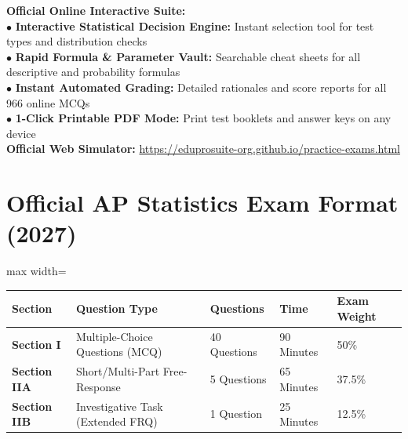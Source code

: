 \begin{center}
\begin{tcolorbox}[standard jigsaw,width=0.95\linewidth,colback=NavyBlue!5!white,colframe=NavyBlue,title=\textbf{FREE DIGITAL WEB COMPANION \& PRACTICE PORTAL}]
\begin{minipage}{0.95\linewidth}
  \textbf{Official Online Interactive Suite:}\\
  $\bullet$ \textbf{Interactive Statistical Decision Engine:} Instant selection tool for test types and distribution checks\\
  $\bullet$ \textbf{Rapid Formula \& Parameter Vault:} Searchable cheat sheets for all descriptive and probability formulas\\
  $\bullet$ \textbf{Instant Automated Grading:} Detailed rationales and score reports for all 966 online MCQs\\
  $\bullet$ \textbf{1-Click Printable PDF Mode:} Print test booklets and answer keys on any device\\[6pt]
  \textbf{Official Web Simulator:} \url{https://eduprosuite-org.github.io/practice-exams.html}
\end{minipage}
\end{tcolorbox}
\end{center}

\section*{Official AP Statistics Exam Format (2027)}
\begin{adjustbox}{max width=\linewidth}
\begin{tabular}{lllll}
\toprule
\textbf{Section} & \textbf{Question Type} & \textbf{Questions} & \textbf{Time} & \textbf{Exam Weight} \\
\midrule
\textbf{Section I} & Multiple-Choice Questions (MCQ) & 40 Questions & 90 Minutes & 50\% \\
\textbf{Section IIA} & Short/Multi-Part Free-Response & 5 Questions & 65 Minutes & 37.5\% \\
\textbf{Section IIB} & Investigative Task (Extended FRQ) & 1 Question & 25 Minutes & 12.5\% \\
\bottomrule
\end{tabular}
\end{adjustbox}

